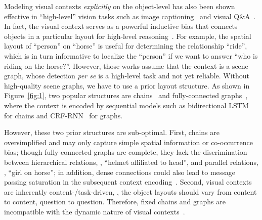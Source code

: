 \documentclass[10pt,twocolumn,letterpaper]{article}
\begin{document}
Modeling visual contexts \emph{explicitly} on the object-level has also been shown effective in ``high-level'' vision tasks such as image captioning~\cite{Yao_2018_ECCV} and visual Q\&A~\cite{Teney_2017_CVPR}. In fact, the visual context serves as a powerful inductive bias that connects objects in a particular layout for high-level reasoning~\cite{li2017scene, liu2018structure, Teney_2017_CVPR, Yao_2018_ECCV}. For example, the spatial layout of ``person'' on ``horse'' is useful for determining the relationship ``ride'', which is in turn informative to localize the ``person'' if we want to answer ``who is riding on the horse?''. However, those works assume that the context is a scene graph, whose detection \textit{per se} is a high-level task and not yet reliable. Without high-quality scene graphs, we have to use a prior layout structure. As shown in Figure~\ref{fig:1}, two popular structures are chains~\cite{zellers2017neural} and fully-connected graphs~\cite{Chen_2018_CVPR, dai2017detecting, li2018factorizable, xu2017scene, yin2018zoom}, where the context is encoded by sequential models such as bidirectional LSTM~\cite{hochreiter1997long} for chains and CRF-RNN~\cite{zheng2015conditional} for graphs. 

However, these two prior structures are sub-optimal. First, chains are oversimplified and may only capture simple spatial information or co-occurrence bias; though fully-connected graphs are complete, they lack the discrimination between hierarchical relations, \eg, ``helmet affiliated to head'', and parallel relations, \eg,  ``girl on horse''; in addition, dense connections could also lead to message passing saturation in the subsequent context encoding~\cite{xu2017scene}. Second, visual contexts are inherently content-/task-driven, \eg, the object layouts should vary from content to content, question to question. Therefore, fixed chains and graphs are incompatible with the dynamic nature of visual contexts~\cite{watanabe1998task}. 
\end{document}

